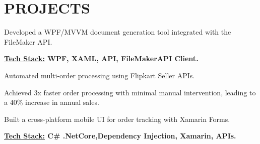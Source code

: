 \documentclass[]{deedy-resume-openfont}
\begin{document}
\begin{minipage}[t]{0.66\textwidth}

\section{PROJECTS}

\begin{tightemize}
\item Developed a WPF/MVVM document generation tool integrated with the FileMaker API.
\item \textbf{ \underline{Tech Stack:} WPF, XAML, API, FileMakerAPI Client.}
\end{tightemize}
\sectionsep

\begin{tightemize}
\item Automated multi-order processing using Flipkart Seller APIs.
\item Achieved 3x faster order processing with minimal manual intervention, leading to a 40\% increase in annual sales.
\item Built a cross-platform mobile UI for order tracking with Xamarin Forms.
\item \textbf{ \underline{Tech Stack:} C\# .NetCore,Dependency Injection, Xamarin, APIs.}
\end{tightemize}
\sectionsep

\end{minipage} 
\end{document}
